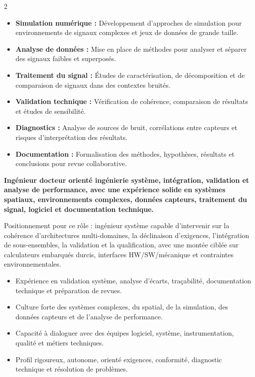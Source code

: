 \documentclass[8pt,a4paper,ragged2e,withhyper]{altacv}
\begin{document}
\begin{paracol}{2}
\begin{itemize}
  \item \textbf{Simulation numérique :} Développement d’approches de simulation pour environnements de signaux complexes et jeux de données de grande taille.
  \item \textbf{Analyse de données :} Mise en place de méthodes pour analyser et séparer des signaux faibles et superposés.
  \item \textbf{Traitement du signal :} Études de caractérisation, de décomposition et de comparaison de signaux dans des contextes bruités.
  \item \textbf{Validation technique :} Vérification de cohérence, comparaison de résultats et études de sensibilité.
  \item \textbf{Diagnostics :} Analyse de sources de bruit, corrélations entre capteurs et risques d’interprétation des résultats.
  \item \textbf{Documentation :} Formalisation des méthodes, hypothèses, résultats et conclusions pour revue collaborative.
\end{itemize}

\switchcolumn


\textbf{Ingénieur docteur orienté ingénierie système, intégration, validation et analyse de performance, avec une expérience solide en systèmes spatiaux, environnements complexes, données capteurs, traitement du signal, logiciel et documentation technique.}

Positionnement pour ce rôle : ingénieur système capable d’intervenir sur la cohérence d’architectures multi-domaines, la déclinaison d’exigences, l’intégration de sous-ensembles, la validation et la qualification, avec une montée ciblée sur calculateurs embarqués durcis, interfaces HW/SW/mécanique et contraintes environnementales.

\begin{itemize}
  \item Expérience en validation système, analyse d’écarts, traçabilité, documentation technique et préparation de revues.
  \item Culture forte des systèmes complexes, du spatial, de la simulation, des données capteurs et de l’analyse de performance.
  \item Capacité à dialoguer avec des équipes logiciel, système, instrumentation, qualité et métiers techniques.
  \item Profil rigoureux, autonome, orienté exigences, conformité, diagnostic technique et résolution de problèmes.
\end{itemize}


\end{paracol}
\end{document}
